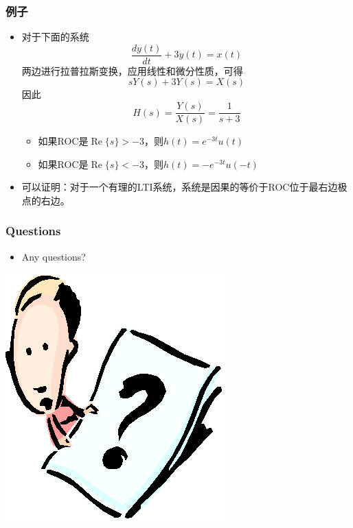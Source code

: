 \documentclass[CJKutf8,dvipsnames,table]{beamer}
\newif\ifxetexorluatex %
\begin{document}
\begin{CJK*}{UTF8}{song}
  \begin{frame}
    \frametitle{例子}
    \begin{itemize}
    \item 对于下面的系统
    \[
    	\frac{dy(t)}{dt} + 3y(t) = x(t)
    \]
    两边进行拉普拉斯变换，应用线性和微分性质，可得
    \[
    	sY(s) + 3Y(s) = X(s)
    \]
    因此
    \[
    	H(s) = \frac{Y(s)}{X(s)} = \frac{1}{s+3}    
    \]
    	\begin{itemize}
		\item 如果ROC是$\operatorname{Re}\{s\} > -3$，则$h(t) = e^{-3t}u(t)$
		\item 如果ROC是$\operatorname{Re}\{s\} < -3$，则$h(t) = -e^{-3t}u(-t)$	
		\end{itemize}
		
	\item 可以证明：对于一个有理的LTI系统，系统是因果的等价于ROC位于最右边极点的右边。
    \end{itemize}
  \end{frame}
    
            
  \begin{frame}
    \frametitle{Questions}
    \begin{itemize}
    \item Any questions?
    \end{itemize}
    \begin{center}
      \includegraphics[scale=.5]{question}
    \end{center}
  \end{frame}    
  
\ifxetexorluatex\else
\end{CJK*}  
\fi  
\end{document}
